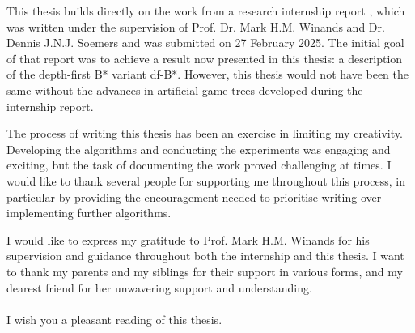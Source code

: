 %
%
%
This thesis builds directly on the work from a research internship report \cite{Anema2025}, which was written under the supervision of Prof. Dr. Mark H.M. Winands and Dr. Dennis J.N.J. Soemers and was submitted on 27 February 2025. The initial goal of that report was to achieve a result now presented in this thesis: a description of the depth-first B* variant df-B*. However, this thesis would not have been the same without the advances in artificial game trees developed during the internship report.

The process of writing this thesis has been an exercise in limiting my creativity. Developing the algorithms and conducting the experiments was engaging and exciting, but the task of documenting the work proved challenging at times. I would like to thank several people for supporting me throughout this process, in particular by providing the encouragement needed to prioritise writing over implementing further algorithms.

I would like to express my gratitude to Prof. Mark H.M. Winands for his supervision and guidance throughout both the internship and this thesis. I want to thank my parents and my siblings for their support in various forms, and my dearest friend for her unwavering support and understanding.
\\\phantom{}\vspace{1ex}\\
\noindent I wish you a pleasant reading of this thesis.